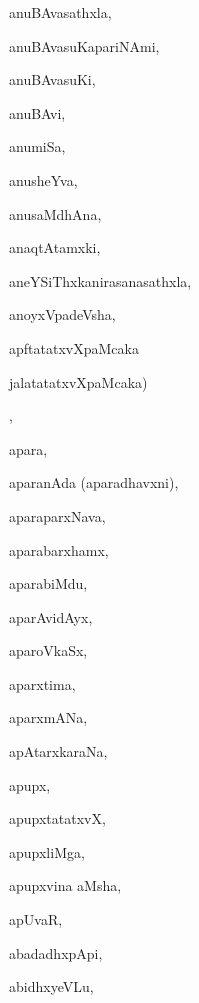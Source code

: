 \begin{multicols}{3}
{\noindent
{anuBAvasathxla}, \pageref{anuBAvasathxla}

\noindent
{anuBAvasuKapariNAmi}, \pageref{anuBAvasuKapariNAmi}

\noindent
{anuBAvasuKi}, \pageref{anuBAvasuKi}

\noindent
{anuBAvi}, \pageref{anuBAvi}

\noindent
{anumiSa}, \pageref{anumiSa}

\noindent
{anusheYva}, \pageref{anusheYva}

\noindent
{anusaMdhAna}, \pageref{anusaMdhAna}

\noindent
{anaqtAtamxki}, \pageref{anaqtAtamxki}

\noindent
{aneYSiThxkanirasanasathxla}, \pageref{aneYSiThxkanirasanasathxla}

\noindent
{anoyxVpadeVsha}, \pageref{anoyxVpadeVsha}

\noindent
{apftatatxvXpaMcaka 

\noindent
\qquad jalatatatxvXpaMcaka)}, \pageref{apftatatxvXpaMcaka (jalatatatxvXpaMcaka)}

\noindent
{apara}, \pageref{apara}

\noindent
{aparanAda (aparadhavxni)}, \pageref{aparanAda (aparadhavxni)}

\noindent
{aparaparxNava}, \pageref{aparaparxNava}

\noindent
{aparabarxhamx}, \pageref{aparabarxhamx}

\noindent
{aparabiMdu}, \pageref{aparabiMdu}

\noindent
{aparAvidAyx}, \pageref{aparAvidAyx}

\noindent
{aparoVkaSx}, \pageref{aparoVkaSx}

\noindent
{aparxtima}, \pageref{aparxtima}

\noindent
{aparxmANa}, \pageref{aparxmANa}

\noindent
{apAtarxkaraNa}, \pageref{apAtarxkaraNa}

\noindent
{apupx}, \pageref{apupx}

\noindent
{apupxtatatxvX}, \pageref{apupxtatatxvX}

\noindent
{apupxliMga}, \pageref{apupxliMga}

\noindent
{apupxvina aMsha}, \pageref{apupxvina aMsha}

\noindent
{apUvaR}, \pageref{apUvaR}

\noindent
{abadadhxpApi}, \pageref{abadadhxpApi}

\noindent
{abidhxyeVLu}, \pageref{abidhxyeVLu}

}
\end{multicols}
